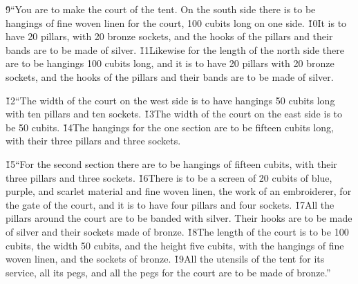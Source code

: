 \v{9}``You are to make the court of the tent. On the south side there is to be hangings of fine woven linen for the court, 100 cubits long on one side. \v{10}It is to have 20 pillars, with 20 bronze sockets, and the hooks of the pillars and their bands are to be made of silver. \v{11}Likewise for the length of the north side there are to be hangings 100 cubits long, and it is to have 20 pillars with 20 bronze sockets, and the hooks of the pillars and their bands are to be made of silver.

\v{12}``The width of the court on the west side is to have hangings 50 cubits long with ten pillars and ten sockets. \v{13}The width of the court on the east side is to be 50 cubits. \v{14}The hangings for the one section are to be fifteen cubits long, with their three pillars and three sockets.

\v{15}``For the second section there are to be hangings of fifteen cubits, with their three pillars and three sockets. \v{16}There is to be a screen of 20 cubits of blue, purple, and scarlet material and fine woven linen, the work of an embroiderer, for the gate of the court, and it is to have four pillars and four sockets. \v{17}All the pillars around the court are to be banded with silver. Their hooks are to be made of silver and their sockets made of bronze. \v{18}The length of the court is to be 100 cubits, the width 50 cubits, and the height five cubits, with the hangings of fine woven linen, and the sockets of bronze. \v{19}All the utensils of the tent for its service, all its pegs, and all the pegs for the court are to be made of bronze.''

